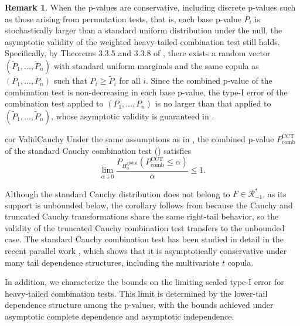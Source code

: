 \documentclass[12pt]{article}
\theoremstyle{plain}
\theoremstyle{plain}
\theoremstyle{definition}
\newtheorem{rem}{Remark}[section]
\begin{document}
\begin{rem}
When the p-values are conservative, including discrete p-values such as those arising from permutation tests, that is, each base p-value $P_i$ is stochastically larger than a standard uniform distribution under the null, the asymptotic validity of the weighted heavy-tailed combination test still holds.  
Specifically, by Theorems 3.3.5 and 3.3.8 of \cite{muller2002comparison},
there exists a random vector $(\tilde P_1,\dots,\tilde P_n)$ with  standard uniform marginals and the same copula as $(P_1,\dots,P_n)$ such that 
$P_i\ge \tilde P_i$ for all $i$. 
Since the combined p-value of the combination test is non-decreasing in each base p-value, 
the type-I error of the combination test applied to $(P_1,\dots,P_n)$ is no larger than that applied to   $(\tilde  P_1,\dots,\tilde  P_n)$, whose asymptotic validity is guaranteed in . 
\end{rem}

\begin{restatable}{cor}
{ValidCauchy}
\label{cor:CCT-validity}
    Under the same assumptions as in , the combined 
p-value $P_{\mathrm{comb}}^{\mathrm{CCT}}$
 of the standard Cauchy combination test () satisfies
$$\lim_{\alpha \downarrow 0} \frac{P_{H_0^{\mathrm{global}}}(P_{\mathrm{comb}}^{\mathrm{CCT}} \leq \alpha)}{\alpha} \leq 1.$$
\end{restatable}

Although the standard Cauchy distribution does not belong to $F\in\mathscr{R}_{-1}^*$, as its support is unbounded below, the corollary follows from  because the Cauchy and truncated Cauchy transformations share the same right-tail behavior, so the validity of the truncated Cauchy combination test transfers to the unbounded case. The standard Cauchy combination test has been studied in detail in the recent parallel work \cite{chakraborty2025universal}, which shows that it is asymptotically conservative under many tail dependence structures, including the multivariate $t$ copula.


In addition, we characterize the bounds on the limiting scaled type-I error for heavy-tailed combination tests. This limit is determined by the lower-tail dependence structure among the p-values, with the bounds achieved under asymptotic complete dependence and asymptotic independence.
\end{document}
